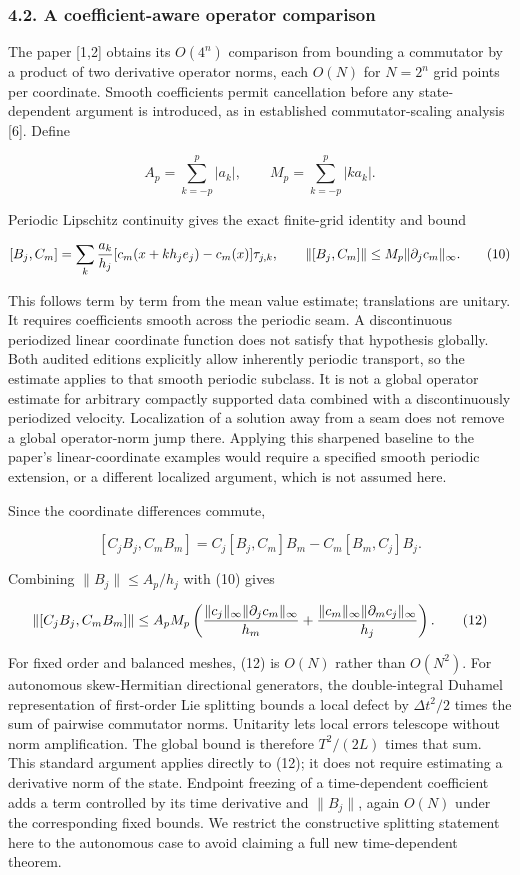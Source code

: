 \subsubsection{4.2. A coefficient-aware operator
comparison}\label{a-coefficient-aware-operator-comparison}

The paper {[}1,2{]} obtains its \(O(4^n)\) comparison from bounding a
commutator by a product of two derivative operator norms, each \(O(N)\)
for \(N=2^n\) grid points per coordinate. Smooth coefficients permit
cancellation before any state-dependent argument is introduced, as in
established commutator-scaling analysis {[}6{]}. Define

\[
A_p=\sum_{k=-p}^p|a_k|,\qquad
M_p=\sum_{k=-p}^p|k a_k|. \tag{9}
\]

Periodic Lipschitz continuity gives the exact finite-grid identity and
bound

\[
[B_j,C_m]=\sum_k {a_k\over h_j}
[c_m(x+kh_j e_j)-c_m(x)]\tau_{j,k},\qquad
\|[B_j,C_m]\|\leq M_p\|\partial_j c_m\|_\infty. \tag{10}
\]

This follows term by term from the mean value estimate; translations are
unitary. It requires coefficients smooth across the periodic seam. A
discontinuous periodized linear coordinate function does not satisfy
that hypothesis globally. Both audited editions explicitly allow
inherently periodic transport, so the estimate applies to that smooth
periodic subclass. It is not a global operator estimate for arbitrary
compactly supported data combined with a discontinuously periodized
velocity. Localization of a solution away from a seam does not remove a
global operator-norm jump there. Applying this sharpened baseline to the
paper's linear-coordinate examples would require a specified smooth
periodic extension, or a different localized argument, which is not
assumed here.

Since the coordinate differences commute,

\[
[C_jB_j,C_mB_m]
=C_j[B_j,C_m]B_m-C_m[B_m,C_j]B_j. \tag{11}
\]

Combining \(\|B_j\|\leq A_p/h_j\) with (10) gives

\[
\|[C_jB_j,C_mB_m]\|\leq A_pM_p
\left({\|c_j\|_\infty\|\partial_jc_m\|_\infty\over h_m}
+{\|c_m\|_\infty\|\partial_mc_j\|_\infty\over h_j}\right). \tag{12}
\]

For fixed order and balanced meshes, (12) is \(O(N)\) rather than
\(O(N^2)\). For autonomous skew-Hermitian directional generators, the
double-integral Duhamel representation of first-order Lie splitting
bounds a local defect by \(\Delta t^2/2\) times the sum of pairwise
commutator norms. Unitarity lets local errors telescope without norm
amplification. The global bound is therefore \(T^2/(2L)\) times that
sum. This standard argument applies directly to (12); it does not
require estimating a derivative norm of the state. Endpoint freezing of
a time-dependent coefficient adds a term controlled by its time
derivative and \(\|B_j\|\), again \(O(N)\) under the corresponding fixed
bounds. We restrict the constructive splitting statement here to the
autonomous case to avoid claiming a full new time-dependent theorem.

